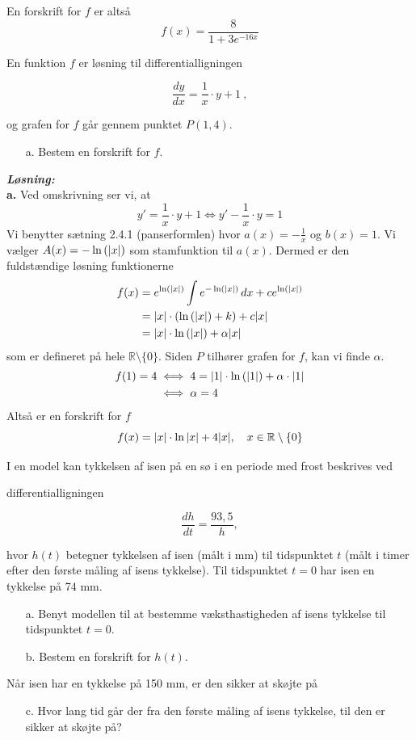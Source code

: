 \documentclass{article}
\newcommand{\sol}{\setlength{\parindent}{0cm}\textbf{\textit{Løsning:}}\setlength{\parindent}{1cm}}
\begin{document}
En forskrift for $f$ er altså
\[
f(x)= \frac{8}{1+ 3 e^{-16x}}
\] 
\begin{question}{}{}
  En funktion $f$ er løsning til differentialligningen

$$\frac{dy}{dx}=\frac{1}{x}\cdot y+1\:,$$

og grafen for $f$ går gennem punktet $P(1,4).$
\begin{itemize}
  \item[a.] Bestem en forskrift for $f.$
\end{itemize}
\end{question}
\sol \\
\textbf{a.}
Ved omskrivning ser vi, at
\[
y'=\frac{1}{x}\cdot y +1 \iff y'-\frac{1}{x}\cdot y=1
\] 
Vi benytter sætning 2.4.1 (panserformlen) hvor $a(x)=-\frac{1}{x}$ og $b(x)=1$. 
Vi vælger $A(x)=-\ln\left(\abs{x}\right) $ som stamfunktion til $a(x)$. 
Dermed er den fuldstændige løsning funktionerne
\begin{equation*}
\begin{split}
  f(x)&=e^{\ln\left(\abs{ x}\right) } \int e^{- \ln\left(\abs{ x} \right) }  \,dx +c e^{\ln\left(\abs{ x }\right) } \\
  &=\abs{ x} \cdot \left(\ln\left(\abs{ x}\right) +k\right) +c \abs{ x} \\
  &=\abs{x} \cdot \ln\left(\abs{x} \right) + \alpha \abs{x} 
\end{split}
\end{equation*}
som er defineret på hele $\mathbb{R}\setminus \{0\}$.
Siden $P$ tilhører grafen for $f$, kan vi finde $\alpha$.
\begin{equation*}
\begin{split}
  f(1)= 4 &\iff 4=\abs{1} \cdot \ln\left(\abs{1} \right) +\alpha \cdot \abs{1} \\
  &\iff \alpha=4
\end{split}
\end{equation*}
Altså er en forskrift for $f$
\[
f(x)= \abs{x} \cdot \ln\abs{x} + 4 \abs{x}, \quad x \in \mathbb{R}\setminus \{0\}
\] 
\begin{question}{}{}
  I en model kan tykkelsen af isen på en sø i en periode med frost beskrives ved

differentialligningen

$$\frac{dh}{dt}=\frac{93,5}h,$$

hvor $h(t)$ betegner tykkelsen af isen (målt i mm) til tidspunktet $t$ (målt i timer efter den
første måling af isens tykkelse).
Til tidspunktet $t=0$ har isen en tykkelse på 74 mm.
\begin{itemize}
  \item[a.] Benyt modellen til at bestemme væksthastigheden af isens tykkelse til tidspunktet $t=0.$
  \item[b.] Bestem en forskrift for $h\left(t\right).$
\end{itemize}
Når isen har en tykkelse på 150 mm, er den sikker at skøjte på
\begin{itemize}
  \item[c.] Hvor lang tid går der fra den første måling af isens tykkelse, til den er sikker at skøjte på?
\end{itemize}
\end{question}
\end{document}
